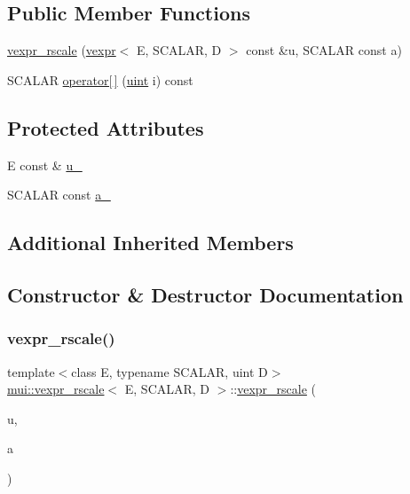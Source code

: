 \subsection*{Public Member Functions}
\begin{DoxyCompactItemize}
\item 
\hyperlink{structmui_1_1vexpr__rscale_ae3528b7326586a7d5c66e729053a3294}{vexpr\+\_\+rscale} (\hyperlink{structmui_1_1vexpr}{vexpr}$<$ E, S\+C\+A\+L\+AR, D $>$ const \&u, S\+C\+A\+L\+AR const a)
\item 
S\+C\+A\+L\+AR \hyperlink{structmui_1_1vexpr__rscale_a93714b51cff9d8fb745881a4cc9eb9d3}{operator\mbox{[}$\,$\mbox{]}} (\hyperlink{namespacemui_af15a3e7188a2117fb9965277bb0cacd2}{uint} i) const
\end{DoxyCompactItemize}
\subsection*{Protected Attributes}
\begin{DoxyCompactItemize}
\item 
E const  \& \hyperlink{structmui_1_1vexpr__rscale_ac4e8567acb997b3fc2fb5a1a7a6fda96}{u\+\_\+}
\item 
S\+C\+A\+L\+AR const \hyperlink{structmui_1_1vexpr__rscale_a095b01b590708a6b8f87ac4e89965ff5}{a\+\_\+}
\end{DoxyCompactItemize}
\subsection*{Additional Inherited Members}


\subsection{Constructor \& Destructor Documentation}
\mbox{\label{structmui_1_1vexpr__rscale_ae3528b7326586a7d5c66e729053a3294}} 
\subsubsection{\texorpdfstring{vexpr\+\_\+rscale()}{vexpr\_rscale()}}
{\footnotesize\ttfamily template$<$class E, typename S\+C\+A\+L\+AR, uint D$>$ \\
\hyperlink{structmui_1_1vexpr__rscale}{mui\+::vexpr\+\_\+rscale}$<$ E, S\+C\+A\+L\+AR, D $>$\+::\hyperlink{structmui_1_1vexpr__rscale}{vexpr\+\_\+rscale} (\begin{DoxyParamCaption}\item[{\hyperlink{structmui_1_1vexpr}{vexpr}$<$ E, S\+C\+A\+L\+AR, D $>$ const \&}]{u,  }\item[{S\+C\+A\+L\+AR const}]{a }\end{DoxyParamCaption})\hspace{0.3cm}{\ttfamily [inline]}}



